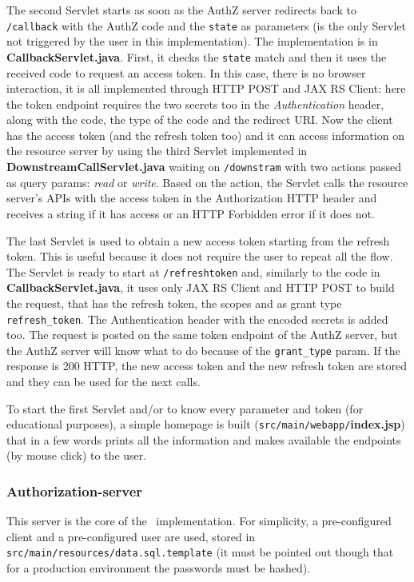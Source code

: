The second Servlet starts as soon as the AuthZ server redirects back to \texttt{/callback} with the AuthZ code and the \texttt{state} as parameters (is the only Servlet not triggered by the user in this implementation). The implementation is in \textbf{CallbackServlet.java}. First, it checks the \texttt{state} match and then it uses the received code to request an access token. In this case, there is no browser interaction, it is all implemented through HTTP POST and JAX RS Client: here the token endpoint requires the two secrets too in the \textit{Authentication} header, along with the code, the type of the code and the redirect URI. Now the client has the access token (and the refresh token too) and it can access information on the resource server by using the third Servlet implemented in \textbf{DownstreamCallServlet.java} waiting on \texttt{/downstram} with two actions passed as query params: \textit{read} or \textit{write}. Based on the action, the Servlet calls the resource server's APIs with the access token in the Authorization HTTP header and receives a string if it has access or an HTTP Forbidden error if it does not.

The last Servlet is used to obtain a new access token starting from the refresh token. This is useful because it does not require the user to repeat all the flow. The Servlet is ready to start at \texttt{/refreshtoken} and, similarly to the code in \textbf{CallbackServlet.java}, it uses only JAX RS Client and HTTP POST to build the request, that has the refresh token, the scopes and as grant type \texttt{refresh\_token}. The Authentication header with the encoded secrets is added too. The request is posted on the same token endpoint of the AuthZ server, but the AuthZ server will know what to do because of the \texttt{grant\_type} param. If the response is 200 HTTP, the new access token and the new refresh token are stored and they can be used for the next calls.

To start the first Servlet and/or to know every parameter and token (for educational purposes), a simple homepage is built (\texttt{src/main/webapp/}\textbf{index.jsp}) that in a few words prints all the information and makes available the endpoints (by mouse click) to the user.

\subsubsection{Authorization-server}
This server is the core of the \oauth\ implementation. For simplicity, a pre-configured client and a pre-configured user are used, stored in \texttt{src/main/resources/data.sql.template} (it must be pointed out though that for a production environment the passwords must be hashed). 

